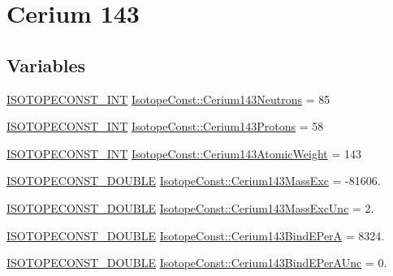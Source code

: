 \hypertarget{group___isotope_const-_cerium-_ce143}{}\section{Cerium 143}
\label{group___isotope_const-_cerium-_ce143}
\subsection*{Variables}
\begin{DoxyCompactItemize}
\item 
\mbox{\hyperlink{group___isotope_const-_macros_ga5f18360b3e99483a35c32d789e62621c}{I\+S\+O\+T\+O\+P\+E\+C\+O\+N\+S\+T\+\_\+\+I\+NT}} \mbox{\hyperlink{group___isotope_const-_cerium-_ce143_ga6c4a6da99fd7571987602c77b9f8aff4}{Isotope\+Const\+::\+Cerium143\+Neutrons}} = 85
\item 
\mbox{\hyperlink{group___isotope_const-_macros_ga5f18360b3e99483a35c32d789e62621c}{I\+S\+O\+T\+O\+P\+E\+C\+O\+N\+S\+T\+\_\+\+I\+NT}} \mbox{\hyperlink{group___isotope_const-_cerium-_ce143_gaa5ac7db14fd3565fffa4298b2c5dc556}{Isotope\+Const\+::\+Cerium143\+Protons}} = 58
\item 
\mbox{\hyperlink{group___isotope_const-_macros_ga5f18360b3e99483a35c32d789e62621c}{I\+S\+O\+T\+O\+P\+E\+C\+O\+N\+S\+T\+\_\+\+I\+NT}} \mbox{\hyperlink{group___isotope_const-_cerium-_ce143_gaa4dbb5da35dc2388068b42c3beb6e66e}{Isotope\+Const\+::\+Cerium143\+Atomic\+Weight}} = 143
\item 
\mbox{\hyperlink{group___isotope_const-_macros_ga8f45a7272ce02c0b4c65c44636ed719a}{I\+S\+O\+T\+O\+P\+E\+C\+O\+N\+S\+T\+\_\+\+D\+O\+U\+B\+LE}} \mbox{\hyperlink{group___isotope_const-_cerium-_ce143_ga6773dbd51c2cf618a28c3551aae50d9d}{Isotope\+Const\+::\+Cerium143\+Mass\+Exc}} = -\/81606.
\item 
\mbox{\hyperlink{group___isotope_const-_macros_ga8f45a7272ce02c0b4c65c44636ed719a}{I\+S\+O\+T\+O\+P\+E\+C\+O\+N\+S\+T\+\_\+\+D\+O\+U\+B\+LE}} \mbox{\hyperlink{group___isotope_const-_cerium-_ce143_ga633b2df39b5a4dc0f10be6dfec4c53c0}{Isotope\+Const\+::\+Cerium143\+Mass\+Exc\+Unc}} = 2.
\item 
\mbox{\hyperlink{group___isotope_const-_macros_ga8f45a7272ce02c0b4c65c44636ed719a}{I\+S\+O\+T\+O\+P\+E\+C\+O\+N\+S\+T\+\_\+\+D\+O\+U\+B\+LE}} \mbox{\hyperlink{group___isotope_const-_cerium-_ce143_ga4bbfd259338c82b6fca6ffe4165f8601}{Isotope\+Const\+::\+Cerium143\+Bind\+E\+PerA}} = 8324.
\item 
\mbox{\hyperlink{group___isotope_const-_macros_ga8f45a7272ce02c0b4c65c44636ed719a}{I\+S\+O\+T\+O\+P\+E\+C\+O\+N\+S\+T\+\_\+\+D\+O\+U\+B\+LE}} \mbox{\hyperlink{group___isotope_const-_cerium-_ce143_ga065747721a795d8750cb62f8547ade16}{Isotope\+Const\+::\+Cerium143\+Bind\+E\+Per\+A\+Unc}} = 0.

\end{DoxyCompactItemize}

